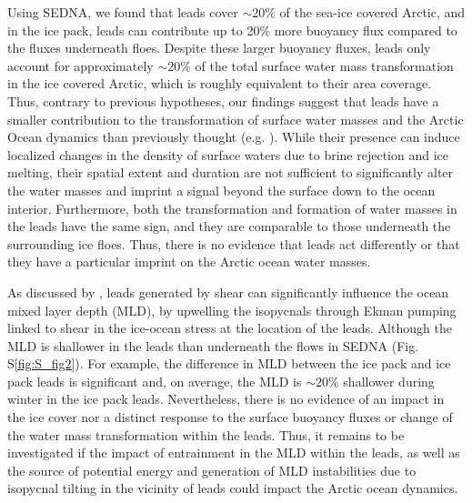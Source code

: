 \documentclass[lineno,sn-basic]{sn-jnl}%
\begin{document}
Using SEDNA, we found that leads cover $\sim 20\%$ of the sea-ice covered Arctic, and in the ice pack, leads can contribute up to 20\% more buoyancy flux compared to the fluxes underneath floes. Despite these larger buoyancy fluxes, leads only account for approximately $\sim 20\%$ of the total surface water mass transformation in the ice covered Arctic, which is roughly equivalent to their area coverage. Thus, contrary to previous hypotheses, our findings suggest that leads have a smaller contribution to the transformation of surface water masses and the Arctic Ocean dynamics than previously thought (e.g. \citealp{Hutter_identification_2019, McPhee_LKF_2005}). While their presence can induce localized changes in the density of surface waters due to brine rejection and ice melting, their spatial extent and duration are not sufficient to significantly alter the water masses and imprint a signal beyond the surface down to the ocean interior. Furthermore, both the transformation and formation of water masses in the leads have the same sign, and they are comparable to those underneath the surrounding ice floes. Thus, there is no evidence that leads act differently or that they have a particular imprint on the Arctic ocean water masses.

As discussed by \citealt{McPhee_LKF_2005}, leads generated by shear can significantly influence the ocean mixed layer depth (MLD), by upwelling the isopycnals through Ekman pumping linked to shear in the ice-ocean stress at the location of the leads. Although the MLD is shallower in the leads than underneath the flows in SEDNA (Fig. S\ref{fig:S_fig2}). For example, the difference in MLD between the ice pack and ice pack leads is significant and, on average, the MLD is $\sim 20\%$ shallower during winter in the ice pack leads. Nevertheless, there is no evidence of an impact in the ice cover nor a distinct response to the surface buoyancy fluxes or change of the water mass transformation within the leads. Thus, it remains to be investigated if the impact of entrainment in the MLD within the leads, as well as the source of potential energy and generation of MLD instabilities due to isopycnal tilting in the vicinity of leads could impact the Arctic ocean dynamics.
\end{document}
